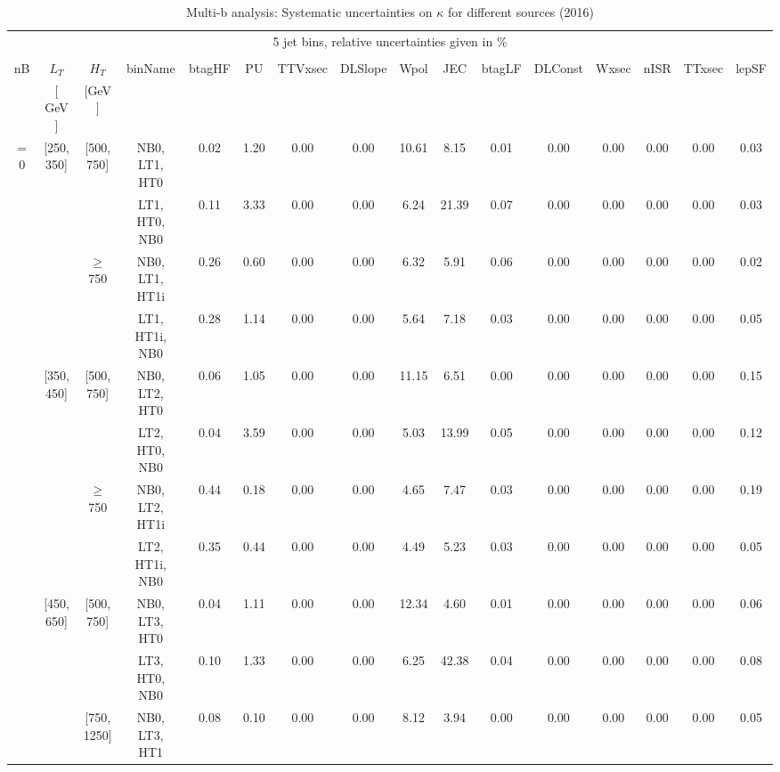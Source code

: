 \begin{sidewaystable}[ht] 
 \tiny 
\caption{Multi-b analysis: Systematic uncertainties on $\kappa$ for different sources (2016)} 
\begin{center} 
\label{tab:sysTable} 
\begin{tabular}{|c | c | c | c | c | c | c | c | c | c | c | c | c | c | c | c | } 
\hline 
\multicolumn{16}{|c|}{5 jet bins, relative uncertainties given in \%} \\ 
\multicolumn{16}{|c|}{} \\ \hline 
nB &  $L_T$ & $H_T$ & binName & btagHF & PU & TTVxsec & DLSlope & Wpol & JEC & btagLF & DLConst & Wxsec & nISR & TTxsec & lepSF  \\ 
   & $[$ GeV $]$  &  $[$GeV$]$  &  &  &  &  &  &  &  &  &  &  &  &  &   \\ \hline 
\cline{1-16} $=$ 0 & [250, 350] & [500, 750]&NB0, LT1, HT0 & 0.02 & 1.20 & 0.00 & 0.00 & 10.61 & 8.15 & 0.01 & 0.00 & 0.00 & 0.00 & 0.00 & 0.03 \\ 
  &  &  &LT1, HT0, NB0 & 0.11 & 3.33 & 0.00 & 0.00 & 6.24 & 21.39 & 0.07 & 0.00 & 0.00 & 0.00 & 0.00 & 0.03 \\ 
\cline{3-16}  & & $\geq$ 750 &NB0, LT1, HT1i & 0.26 & 0.60 & 0.00 & 0.00 & 6.32 & 5.91 & 0.06 & 0.00 & 0.00 & 0.00 & 0.00 & 0.02 \\ 
  &  &  &LT1, HT1i, NB0 & 0.28 & 1.14 & 0.00 & 0.00 & 5.64 & 7.18 & 0.03 & 0.00 & 0.00 & 0.00 & 0.00 & 0.05 \\ 
\cline{2-16}   & [350, 450] & [500, 750]&NB0, LT2, HT0 & 0.06 & 1.05 & 0.00 & 0.00 & 11.15 & 6.51 & 0.00 & 0.00 & 0.00 & 0.00 & 0.00 & 0.15 \\ 
  &  &  &LT2, HT0, NB0 & 0.04 & 3.59 & 0.00 & 0.00 & 5.03 & 13.99 & 0.05 & 0.00 & 0.00 & 0.00 & 0.00 & 0.12 \\ 
\cline{3-16}  & & $\geq$ 750 &NB0, LT2, HT1i & 0.44 & 0.18 & 0.00 & 0.00 & 4.65 & 7.47 & 0.03 & 0.00 & 0.00 & 0.00 & 0.00 & 0.19 \\ 
  &  &  &LT2, HT1i, NB0 & 0.35 & 0.44 & 0.00 & 0.00 & 4.49 & 5.23 & 0.03 & 0.00 & 0.00 & 0.00 & 0.00 & 0.05 \\ 
\cline{2-16}   & [450, 650] & [500, 750]&NB0, LT3, HT0 & 0.04 & 1.11 & 0.00 & 0.00 & 12.34 & 4.60 & 0.01 & 0.00 & 0.00 & 0.00 & 0.00 & 0.06 \\ 
  &  &  &LT3, HT0, NB0 & 0.10 & 1.33 & 0.00 & 0.00 & 6.25 & 42.38 & 0.04 & 0.00 & 0.00 & 0.00 & 0.00 & 0.08 \\ 
\cline{3-16}  & & [750, 1250] &NB0, LT3, HT1 & 0.08 & 0.10 & 0.00 & 0.00 & 8.12 & 3.94 & 0.00 & 0.00 & 0.00 & 0.00 & 0.00 & 0.05 \\ 

\end{tabular}
\end{center}
\end{sidewaystable}
